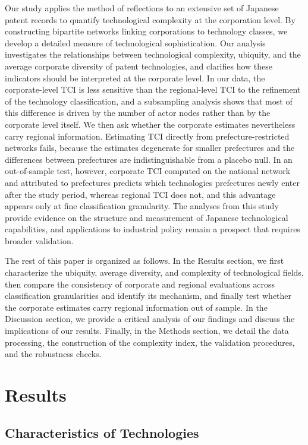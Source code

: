 \documentclass[lineno,pdflatex,sn-mathphys-num]{sn-jnl}%
\theoremstyle{thmstyleone}%
\theoremstyle{thmstyletwo}%
\theoremstyle{thmstylethree}%
\begin{document}
Our study applies the method of reflections to an extensive set of Japanese patent records to quantify technological complexity at the corporation level.
By constructing bipartite networks linking corporations to technology classes, we develop a detailed measure of technological sophistication.
Our analysis investigates the relationships between technological complexity, ubiquity, and the average corporate diversity of patent technologies, and clarifies how these indicators should be interpreted at the corporate level.
In our data, the corporate-level TCI is less sensitive than the regional-level TCI to the refinement of the technology classification, and a subsampling analysis shows that most of this difference is driven by the number of actor nodes rather than by the corporate level itself.
We then ask whether the corporate estimates nevertheless carry regional information.
Estimating TCI directly from prefecture-restricted networks fails, because the estimates degenerate for smaller prefectures and the differences between prefectures are indistinguishable from a placebo null.
In an out-of-sample test, however, corporate TCI computed on the national network and attributed to prefectures predicts which technologies prefectures newly enter after the study period, whereas regional TCI does not, and this advantage appears only at fine classification granularity.
The analyses from this study provide evidence on the structure and measurement of Japanese technological capabilities, and applications to industrial policy remain a prospect that requires broader validation.

The rest of this paper is organized as follows.
In the Results section, we first characterize the ubiquity, average diversity, and complexity of technological fields, then compare the consistency of corporate and regional evaluations across classification granularities and identify its mechanism, and finally test whether the corporate estimates carry regional information out of sample.
In the Discussion section, we provide a critical analysis of our findings and discuss the implications of our results.
Finally, in the Methods section, we detail the data processing, the construction of the complexity index, the validation procedures, and the robustness checks.

\section{Results}\label{section:Results}

\subsection{Characteristics of Technologies}\label{subsection:characteristics}
\end{document}
